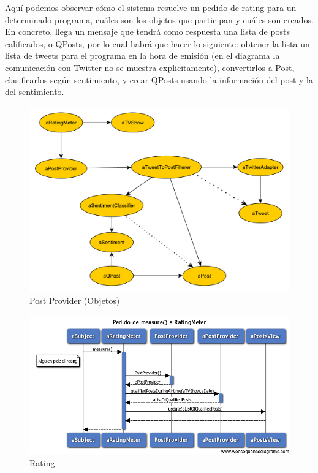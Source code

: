 Aquí podemos observar cómo el sistema resuelve un pedido de rating para un determinado programa, cuáles son los objetos que participan y cuáles son creados. En concreto, llega un mensaje que tendrá como respuesta una lista de posts calificados, o QPosts, por lo cual habrá que hacer lo siguiente: obtener la lista un lista de tweets para el programa en la hora de emisión (en el diagrama la comunicación con Twitter no se muestra explicitamente), convertirlos a Post, clasificarlos según sentimiento, y crear QPosts usando la información del post y la del sentimiento.

\begin{figure}[H]
\centering
\includegraphics[]{graph/objetos/PostProvider.pdf}
\caption{Post Provider (Objetos)}
\end{figure}



\begin{figure}[H]
\centering
\includegraphics[scale=0.6]{graph/diagramas_secuencia/Rating.png}
\caption{Rating}
\end{figure}

